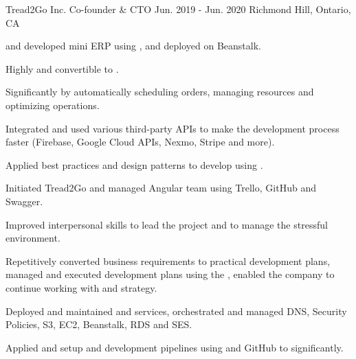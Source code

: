 \begin{cventries}
  \cventry
    {Tread2Go Inc.} %
    {Co-founder \& CTO} %
    {Jun. 2019 - Jun. 2020} %
    {Richmond Hill, Ontario, CA} %
    {
      \begin{cvitems} %
        \item { and developed mini ERP  using ,  and deployed on  Beanstalk.}
          \begin{cvsubitems}
            \item {Highly  and convertible to .}
            \item {Significantly  by automatically scheduling orders, managing resources and optimizing operations.}
            \item {Integrated and used various third-party APIs to make the development process faster  (Firebase, Google Cloud APIs, Nexmo, Stripe and more).}
            \item {Applied best practices and design patterns to develop  using .}
          \end{cvsubitems}
        \item {Initiated Tread2Go  and managed Angular  team using Trello, GitHub and Swagger.}
        \item {Improved interpersonal skills to lead the project and  to manage the stressful environment.}
          \begin{cvsubitems}
            \item {Repetitively converted business requirements to practical development plans, managed and executed development plans using the , enabled the company to continue working with  and  strategy.}
          \end{cvsubitems}
        \item {Deployed and maintained  and  services, orchestrated and managed DNS, Security Policies, S3, EC2, Beanstalk, RDS and SES.}
          \begin{cvsubitems}
            \item {Applied and setup  and development pipelines using  and GitHub to  significantly.}
          \end{cvsubitems}
      \end{cvitems}
    }


\end{cventries}
